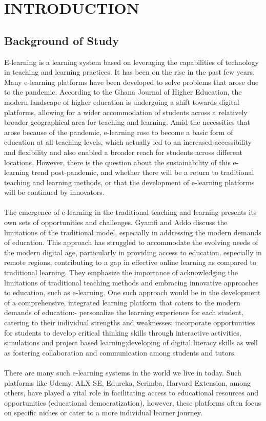 \documentclass[a4paper,12pt]{article}  %
\begin{document}
\section{INTRODUCTION}
\subsection{Background of Study}

E-learning is a learning system based on leveraging the capabilities of
technology in teaching and learning practices. It has been on the rise in the
past few years. Many e-learning platforms have been developed to solve problems
that arose due to the pandemic. According to the Ghana Journal of Higher
Education, the modern landscape of higher education is undergoing a shift
towards digital platforms, allowing for a wider accommodation of students
across a relatively broader geographical area for teaching and learning. Amid
the necessities that arose because of the pandemic, e-learning rose to become a
basic form of education at all teaching levels, which actually led to an
increased accessibility and flexibility and also enabled a broader reach for
students across different locations. However, there is the question about the
sustainability of this e-learning trend post-pandemic, and whether there will
be a return to traditional teaching and learning methods, or that the
development of e-learning platforms will be continued by innovators.\\
\vspace{0.2cm}\\ The emergence of e-learning in the traditional teaching and
learning presents its own sets of opportunities and challenges. Gyamfi and Addo
discuss the limitations of the traditional model, especially in addressing the
modern demands of education.\cite{gyamfi2020stakeholders} This approach has struggled to accommodate the
evolving needs of the modern digital age, particularly in providing access to
education, especially in remote regions, contributing to a gap in effective
online learning as compared to traditional learning. They emphasize the
importance of acknowledging the limitations of traditional teaching methods and
embracing innovative approaches to education, such as e-learning. One such
approach would be in the development of a comprehensive, integrated learning
platform that caters to the modern demands of education:- personalize the
learning experience for each student, catering to their individual strengths
and weaknesses; incorporate opportunities for students to develop critical
thinking skills through interactive activities, simulations and project based
learning;developing of digital literacy skills as well as fostering
collaboration and communication among students and tutors.\\ \vspace{0.2cm}\\
There are many such e-learning systems in the world we live in today. Such
platforms like Udemy, ALX SE, Edureka, Scrimba, Harvard Extension, among
others, have played a vital role in facilitating access to educational
resources and opportunities (educational democratization), however, these
platforms often focus on specific niches or cater to a more individual learner
journey.
\end{document}

